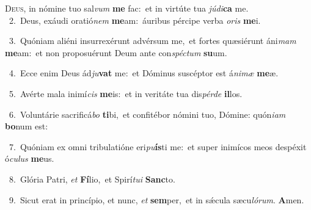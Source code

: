 \lettrine{\initial\textcolor{\initialcolor}{D}}{eus,} in nómine tuo sal\textit{vum} \textbf{me} fac:~\star et in virtúte tua \textit{jú}\-\textit{di}\textbf{ca} me.\\
{\numbfont\textcolor{\numbcolor}{~2.}}~Deus, exáudi oratió\textit{nem} \textbf{me}\-am:~\star áuribus pércipe verba \textit{o}\-\textit{ris} \textbf{me}\-i.\par
{\numbfont\textcolor{\numbcolor}{~3.}}~Quóniam aliéni insurrexérunt advérsum me,~\dagger et fortes quæsiérunt áni\textit{mam} \textbf{me}\-am:~\star et non proposuérunt Deum ante con\-\textit{spéc}\-\textit{tum} \textbf{su}\-um.\par
{\numbfont\textcolor{\numbcolor}{~4.}}~Ecce enim Deus ád\-\textit{ju}\-\textbf{vat} me:~\star et Dóminus suscéptor est á\-\textit{ni}\-\textit{mæ} \textbf{me}\-æ.\par
{\numbfont\textcolor{\numbcolor}{~5.}}~Avérte mala inimí\textit{cis} \textbf{me}\-is:~\star et in veritáte tua dis\-\textit{pér}\-\textit{de} \textbf{il}\-los.\par
{\numbfont\textcolor{\numbcolor}{~6.}}~Voluntárie sacrificá\textit{bo} \textbf{ti}\-bi,~\star et confitébor nómini tuo, Dómine: quón\-\textit{i}\-\textit{am} \textbf{bo}\-num est:\par
{\numbfont\textcolor{\numbcolor}{~7.}}~Quóniam ex omni tribulatióne eri\-\textit{pu}\-\textbf{ís}ti me:~\star et super inimícos meos despéxit ó\-\textit{cu}\-\textit{lus} \textbf{me}\-us.\par
{\numbfont\textcolor{\numbcolor}{~8.}}~Glória Patri, \textit{et} \textbf{Fí}\-lio,~\star et Spirí\-\textit{tu}\-\textit{i} \textbf{Sanc}\-to.\par
{\numbfont\textcolor{\numbcolor}{~9.}}~Sicut erat in princípio, et nunc, \textit{et} \textbf{sem}\-per,~\star et in sǽcula sæcu\-\textit{ló}\-\textit{rum}. \textbf{A}\-men.\par
